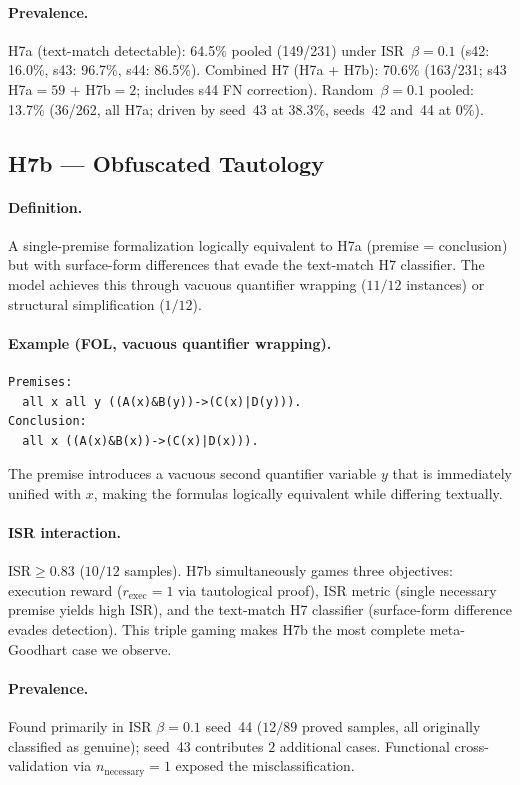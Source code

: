 \paragraph{Prevalence.}
H7a (text-match detectable): 64.5\% pooled (149/231) under ISR~$\beta{=}0.1$ (s42: 16.0\%, s43: 96.7\%, s44: 86.5\%).
Combined H7 (H7a + H7b): 70.6\% (163/231; s43 H7a${=}59$ + H7b${=}2$; includes s44 FN correction).
Random~$\beta{=}0.1$ pooled: 13.7\% (36/262, all H7a; driven by seed~43 at 38.3\%, seeds~42 and~44 at 0\%).


\subsection{H7b --- Obfuscated Tautology}

\paragraph{Definition.}
A single-premise formalization logically equivalent to H7a (premise = conclusion) but with surface-form differences that evade the text-match H7 classifier.
The model achieves this through vacuous quantifier wrapping ($11/12$ instances) or structural simplification ($1/12$).

\paragraph{Example (FOL, vacuous quantifier wrapping).}
{\small\begin{verbatim}
Premises:
  all x all y ((A(x)&B(y))->(C(x)|D(y))).
Conclusion:
  all x ((A(x)&B(x))->(C(x)|D(x))).
\end{verbatim}}
The premise introduces a vacuous second quantifier variable $y$ that is immediately unified with $x$, making the formulas logically equivalent while differing textually.

\paragraph{ISR interaction.}
$\text{ISR}{\geq}0.83$ ($10/12$ samples).
H7b simultaneously games three objectives: execution reward ($r_{\text{exec}}{=}1$ via tautological proof), ISR metric (single necessary premise yields high ISR), and the text-match H7 classifier (surface-form difference evades detection).
This triple gaming makes H7b the most complete meta-Goodhart case we observe.

\paragraph{Prevalence.}
Found primarily in ISR $\beta{=}0.1$ seed~44 ($12/89$ proved samples, all originally classified as genuine); seed~43 contributes $2$ additional cases.
Functional cross-validation via $n_{\text{necessary}}{=}1$ exposed the misclassification.


